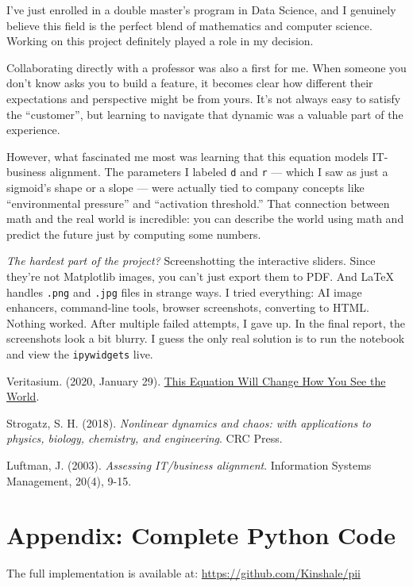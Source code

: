\documentclass[a4paper, 10pt]{article}
\begin{document}
I’ve just enrolled in a double master’s program in Data Science, and I genuinely believe this field is the perfect blend of mathematics and computer science. Working on this project definitely played a role in my decision.

Collaborating directly with a professor was also a first for me. 
When someone you don’t know asks you to build a feature, it becomes clear how different their expectations and perspective might be from yours. 
It’s not always easy to satisfy the “customer”, but learning to navigate that dynamic was a valuable part of the experience.

However, what fascinated me most was learning that this equation models IT-business alignment. 
The parameters I labeled \texttt{d} and \texttt{r} — which I saw as just a sigmoid’s shape or a slope — were actually tied to company concepts like “environmental pressure” and “activation threshold.” 
That connection between math and the real world is incredible: you can describe the world using math and predict the future just by computing some numbers.

\textit{The hardest part of the project?} Screenshotting the interactive sliders. \newline
Since they’re not Matplotlib images, you can’t just export them to PDF. And LaTeX handles \texttt{.png} and \texttt{.jpg} files in strange ways. I tried everything: AI image enhancers, command-line tools, browser screenshots, converting to HTML. Nothing worked. 
After multiple failed attempts, I gave up. In the final report, the screenshots look a bit blurry. I guess the only real solution is to run the notebook and view the \texttt{ipywidgets} live.

\begin{thebibliography}{9}
    Veritasium. (2020, January 29). \href{https://www.veritasium.com/videos/2020/1/29/this-equation-will-change-how-you-see-the-world}{This Equation Will Change How You See the World}.

	Strogatz, S. H. (2018). \textit{Nonlinear dynamics and chaos: with applications to physics, biology, chemistry, and engineering}. CRC Press.

	Luftman, J. (2003). \textit{Assessing IT/business alignment}. Information Systems Management, 20(4), 9-15.
\end{thebibliography}

\appendix
\section{Appendix: Complete Python Code}
The full implementation is available at: \url{https://github.com/Kinshale/pii}
\end{document}
